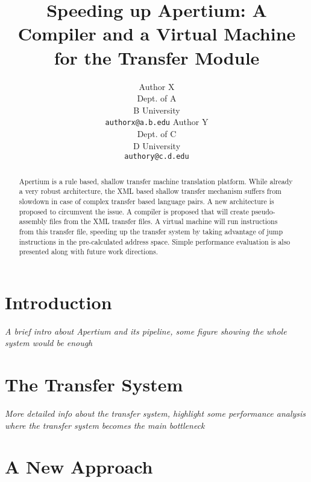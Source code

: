 \documentclass[11pt]{article}
\title{Speeding up Apertium: A Compiler and a Virtual Machine for the
  Transfer Module}
\author{Author X\\
  Dept. of A\\
  B University\\
  {\tt authorx@a.b.edu} \And
  Author Y\\
  Dept. of C\\
  D University\\
  {\tt authory@c.d.edu}
}
\begin{document}
\maketitle

\begin{abstract}
  Apertium is a rule based, shallow transfer machine translation
  platform. While already a very robust architecture,  the XML based
  shallow transfer mechanism suffers from slowdown in case of complex
  transfer based language pairs. A new architecture is proposed to
  circumvent the issue. A compiler is proposed that will create
  pseudo-assembly files from the XML transfer files. A virtual machine
  will run instructions from this transfer file, speeding up the
  transfer system by taking advantage of jump instructions in the
  pre-calculated address space. Simple performance evaluation is also
  presented  along with future work directions.
\end{abstract}


\section{Introduction}
\label{sec:introduction}



{\itshape{A brief intro about Apertium and its pipeline, some figure
    showing the whole system would be enough}}

\section{The Transfer System}
\label{sec:transfer-system}

{\itshape{More detailed info about the transfer system, highlight some
    performance analysis where the transfer system becomes the main
    bottleneck}}

\section{A New Approach}
\label{sec:new-approach}
\end{document}
